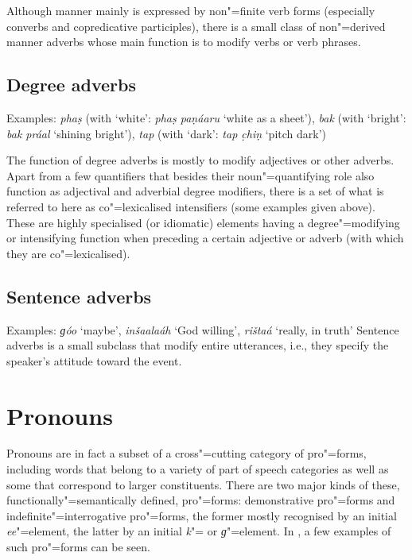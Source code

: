 Although manner mainly is expressed by non"=finite verb forms (especially converbs and copredicative participles), there is a small class of non"=derived manner adverbs whose main function is to modify verbs or verb phrases.


\subsection{Degree adverbs}
\label{subsec:3b-5-4}
Examples: \textit{phaṣ} (with `white': \textit{phaṣ paṇáaru} `white as a sheet'), \textit{bak} (with `bright': \textit{bak práal} `shining bright'), \textit{tap} (with `dark': \textit{tap c̣hiṇ} `pitch dark')


The function of degree adverbs is mostly to modify adjectives or other adverbs. Apart from a few quantifiers that besides their noun"=quantifying role also function as adjectival and adverbial degree modifiers, there is a set of what is referred to here as co"=lexicalised intensifiers (some examples given above). These are highly specialised (or idiomatic) elements having a degree"=modifying or intensifying function when preceding a certain adjective or adverb (with which they are co"=lexicalised). 


\subsection{Sentence adverbs}
\label{subsec:3b-5-5}
Examples: \textit{ɡóo} `maybe', \textit{inšaalaáh} `God willing', \textit{rištaá} `really, in truth'
Sentence adverbs is a small subclass that modify entire utterances, i.e., they specify the speaker’s attitude toward the event.


\section{Pronouns}
\label{sec:3b-6}
Pronouns are in fact a subset of a cross"=cutting category of pro"=forms, including words that belong to a variety of part of speech categories as well as some that correspond to larger constituents. There are two major kinds of these, functionally"=semantically defined, pro"=forms: demonstrative pro"=forms and indefinite"=interrogative pro"=forms, the former mostly recognised by an initial \textit{ee}"=element, the latter by an initial \textit{k}"= or \textit{ɡ}"=element. In , a few examples of such pro"=forms can be seen.


